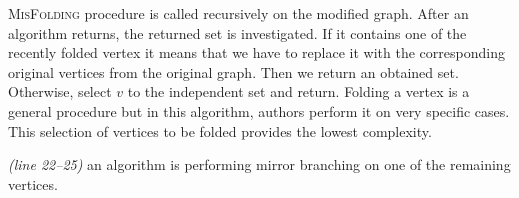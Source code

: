 \textsc{MisFolding} procedure is called recursively on the modified graph. After an algorithm returns, the returned set is investigated. If it contains one of the recently folded vertex it means that we have to replace it with the corresponding original vertices from the original graph. Then we return an obtained set. Otherwise, select $v$ to the independent set and return.
Folding a vertex is a general procedure but in this algorithm, authors perform it on very specific cases. This selection of vertices to be folded provides the lowest complexity.     

\textit{(line 22--25)} an algorithm is performing mirror branching on one of the remaining vertices.    
